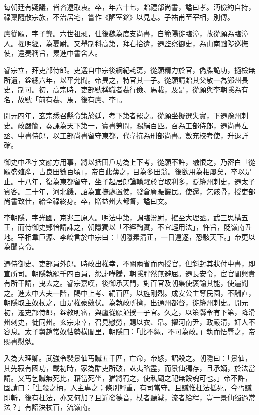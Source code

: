 \begin{pinyinscope}
 每朝廷有疑議，皆咨逮取衷。卒，年六十七，贈禮部尚書，謚曰孝。沔儉約自持，祿稟隨散宗族，不治居宅，嘗作《陋室銘》以見志。子祐甫至宰相，別傳。



 盧從願，字子龔。六世祖昶，仕後魏為度支尚書，自範陽徙臨漳，故從願為臨漳人。擢明經，為夏尉。又舉制科高第，拜右拾遺，遷監察御史，為山南黜陟巡撫使，還奏稱旨，累進中書舍人。



 睿宗立，拜吏部侍郎。吏選自中宗後綱紀耗蕩，從願精力於官，偽牒詭功，擿檢無所遺，銓總六年，以平允聞。帝異之，特官其一子。從願請贈其父敬一為鄭州長史，制可。初，高宗時，吏部號稱職者裴行儉、馬載，及是，從願與李朝隱為有名，故號「前有裴、馬，後有盧、李」。



 開元四年，玄宗悉召縣令策於廷，考下第者罷之。從願坐擬選失實，下遷豫州刺史。政嚴簡，奏課為天下第一，寶書勞問，賜絹百匹。召為工部侍郎，遷尚書左丞、中書侍郎，以工部尚書留守東都，代韋抗為刑部尚書。數充校考使，升退詳確。



 御史中丞宇文融方用事，將以括田戶功為上下考，從願不許，融恨之，乃密白「從願盛殖產，占良田數百頃」，帝自此薄之，目為多田翁。後欲用為相屢矣，卒以是止。十八年，復為東都留守，坐子起居郎論輸糴於官取利多，貶絳州刺史，遷太子賓客。二十年，河北饑，詔為宣撫處置使，發倉廥賑饑民。使還，乞骸骨，授吏部尚書致仕，給全祿終身。卒，贈益州大都督，謚曰文。



 李朝隱，字光國，京兆三原人。明法中第，調臨汾尉，擢至大理丞。武三思構五王，而侍御史鄭愔請誅之，朝隱獨以「不經鞫實，不宜輕用法」，忤旨，貶嶺南丑地。宰相韋巨源、李嶠言於中宗曰：「朝隱素清正，一日遠逐，恐駭天下。」帝更以為聞喜令。



 遷侍御史、吏部員外郎。時政出權幸，不關兩省而內授官，但斜封其狀付中書，即宣所司。朝隱執罷千四百員，怨誹嘩騰，朝隱胖然無避屈。遷長安令，宦官閭興貴有所干請，曳去之。睿宗嘉嘆，後御承天門，對百官及朝集使褒諭其能，使遍聞之。進太中大夫一階，賜中上考、絹百匹，以旌剛烈。成安公主奪民園，不酬直，朝隱取主奴杖之，由是權豪斂伏。為執政所擠，出通州都督，徙絳州刺史。開元初，遷吏部侍郎，銓敘明審，與盧從願並授一子官。久之，以策縣令有下第，降滑州刺史，徙同州。玄宗東幸，召見慰勞，賜以衣、帛。擢河南尹，政嚴清，奸人不容息。太子舅趙常奴怙勢橫閭里，朝隱曰：「此不繩，不可為政。」執而悟辱之，帝賜書慰勉。



 入為大理卿。武強令裴景仙丐贓五千匹，亡命，帝怒，詔殺之。朝隱曰：「景仙，其先寂有國功，載初時，家為酷吏所破，誅夷略盡，而景仙獨存，且承嫡，於法當請。又丐乞贓無死比，藉當死坐，猶將宥之，使私廟之祀無餒魂可也。」帝不許，固請曰：「生殺之柄，人主專之；條別輕重，有司當守。且贓惟枉法抵死，今丐贓即斬，後有枉法，亦又何加？且近發德音，杖者聽減，流者給程，豈一景仙獨過常法？」有詔決杖百，流嶺南。




\end{pinyinscope}

